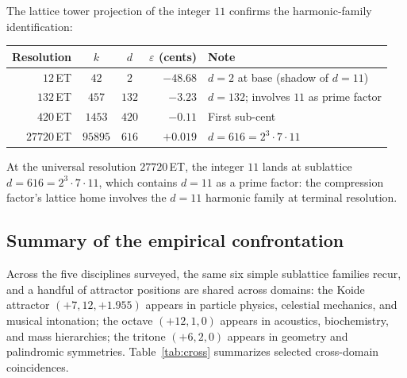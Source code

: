 \documentclass[11pt,a4paper]{article}
\theoremstyle{definition}
\theoremstyle{remark}
\begin{document}
The lattice tower projection of the integer $11$ confirms the harmonic-family identification:
\begin{center}
\begin{tabular}{@{}r c c r l@{}}
\toprule
Resolution & $k$ & $d$ & $\varepsilon$ (cents) & Note\\
\midrule
$12$\,ET & $42$ & $2$ & $-48.68$ & $d=2$ at base (shadow of $d=11$)\\
$132$\,ET & $457$ & $132$ & $-3.23$ & $d=132$; involves $11$ as prime factor\\
$420$\,ET & $1453$ & $420$ & $-0.11$ & First sub-cent\\
$27720$\,ET & $95895$ & $616$ & $+0.019$ & $d = 616 = 2^{3}\!\cdot\!7\!\cdot\!11$\\
\bottomrule
\end{tabular}
\end{center}
At the universal resolution $27720$\,ET, the integer $11$ lands at sublattice $d = 616 = 2^{3}\cdot 7\cdot 11$, which contains $d=11$ as a prime factor: the compression factor's lattice home involves the $d=11$ harmonic family at terminal resolution.

\subsection{Summary of the empirical confrontation}

Across the five disciplines surveyed, the same six simple sublattice families recur, and a handful of attractor positions are shared across domains: the Koide attractor $(+7,12,+1.955)$ appears in particle physics, celestial mechanics, and musical intonation; the octave $(+12,1,0)$ appears in acoustics, biochemistry, and mass hierarchies; the tritone $(+6,2,0)$ appears in geometry and palindromic symmetries. Table~\ref{tab:cross} summarizes selected cross-domain coincidences.
\end{document}

